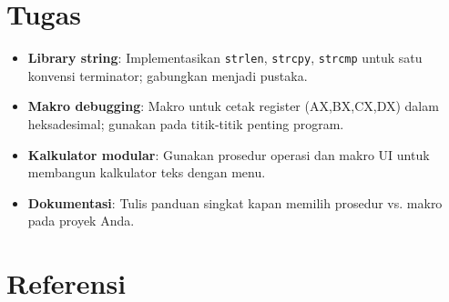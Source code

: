\section{Tugas}
\begin{itemize}
  \item \textbf{Library string}: Implementasikan \texttt{strlen}, \texttt{strcpy}, \texttt{strcmp} untuk satu konvensi terminator; gabungkan menjadi pustaka.
  \item \textbf{Makro debugging}: Makro untuk cetak register (AX,BX,CX,DX) dalam heksadesimal; gunakan pada titik-titik penting program.
  \item \textbf{Kalkulator modular}: Gunakan prosedur operasi dan makro UI untuk membangun kalkulator teks dengan menu.
  \item \textbf{Dokumentasi}: Tulis panduan singkat kapan memilih prosedur vs. makro pada proyek Anda.
\end{itemize}

\section{Referensi}
